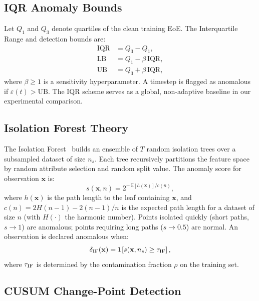 \documentclass[journal]{IEEEtran}
\begin{document}
\subsection{IQR Anomaly Bounds}

Let $Q_1$ and $Q_3$ denote quartiles of the clean training EoE.
The Interquartile Range and detection bounds are:
\begin{align}
  \text{IQR} &= Q_3 - Q_1,
  \label{eq:iqr}\\
  \text{LB}  &= Q_1 - \beta\,\text{IQR},
  \label{eq:lb}\\
  \text{UB}  &= Q_3 + \beta\,\text{IQR},
  \label{eq:ub}
\end{align}
where $\beta\geq 1$ is a sensitivity hyperparameter.
A timestep is flagged as anomalous if $\varepsilon(t)>\text{UB}$.
The IQR scheme serves as a global, non-adaptive baseline
in our experimental comparison.

\subsection{Isolation Forest Theory}

The Isolation Forest~\cite{liu2008isolation} builds an ensemble of
$T$ random isolation trees over a subsampled dataset of size $n_s$.
Each tree recursively partitions the feature space by random
attribute selection and random split value.
The anomaly score for observation $\mathbf{x}$ is:
\begin{equation}
  s(\mathbf{x},n) = 2^{-\,\mathbb{E}[h(\mathbf{x})]/c(n)},
  \label{eq:ifscore}
\end{equation}
where $h(\mathbf{x})$ is the path length to the leaf containing
$\mathbf{x}$, and $c(n) = 2H(n-1) - 2(n-1)/n$ is the
expected path length for a dataset of size $n$
(with $H(\cdot)$ the harmonic number).
Points isolated quickly (short paths, $s\to1$) are anomalous;
points requiring long paths ($s\to0.5$) are normal.
An observation is declared anomalous when:
\begin{equation}
  \delta_{\rm IF}(\mathbf{x}) =
  \mathbf{1}\!\left[s(\mathbf{x},n_s) \geq \tau_{\rm IF}\right],
  \label{eq:ifalarm}
\end{equation}
where $\tau_{\rm IF}$ is determined by the contamination fraction
$\rho$ on the training set.

\subsection{CUSUM Change-Point Detection}
\end{document}
